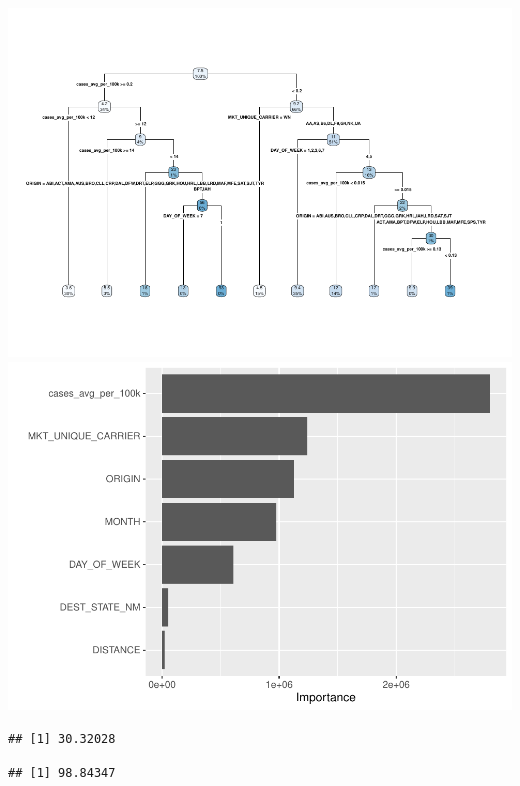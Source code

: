 \documentclass[
]{article}
\begin{document}
\includegraphics{final-project_files/figure-latex/delay-tree-3.pdf}
\includegraphics{final-project_files/figure-latex/delay-tree-4.pdf}

\begin{verbatim}
## [1] 30.32028
\end{verbatim}

\begin{verbatim}
## [1] 98.84347
\end{verbatim}
\end{document}

